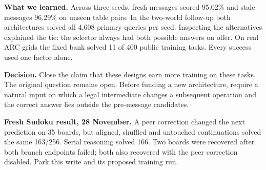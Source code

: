 \textbf{What we learned.} Across three seeds, fresh messages scored 95.02\% and stale messages 96.29\% on unseen table pairs. In the two-world follow-up both architectures solved all 4,608 primary queries per seed. Inspecting the alternatives explained the tie: the selector always had both possible answers on offer. On real ARC grids the fixed bank solved 11 of 400 public training tasks. Every success used one factor alone.
\par
\textbf{Decision.} Close the claim that these designs earn more training on these tasks. The original question remains open. Before funding a new architecture, require a natural input on which a legal intermediate changes a subsequent operation and the correct answer lies outside the pre-message candidates.

\par
\textbf{Fresh Sudoku result, 28 November.} A peer correction changed the next prediction on 35 boards, but aligned, shuffled and untouched continuations solved the same 163/256. Serial reasoning solved 166. Two boards were recovered after both branch endpoints failed; both also recovered with the peer correction disabled. Park this write and its proposed training run.
